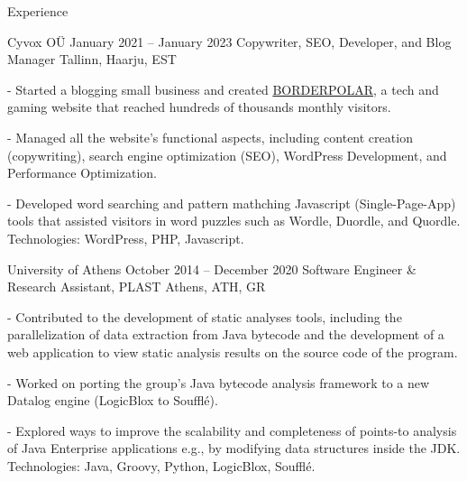 \documentclass{resume}
\begin{document}
\newcommand{\mytilde}{\raise.17ex\hbox{$\scriptstyle\mathtt{\sim}$}}
\newcommand{\indentitem}{\setlength\itemindent{25pt}}

\begin{rSection}{Experience}
  \begin{rSubsection}
    {Cyvox OÜ}
    {January 2021 -- January 2023}
    {Copywriter, SEO, Developer, and Blog Manager}
    {Tallinn, Haarju, EST}
    \item[-] Started a blogging small business and created \href{http://borderpolar.com}{BORDERPOLAR}, a tech and gaming website that reached hundreds of thousands monthly visitors.
    \item[-] Managed all the website's functional aspects, including content creation (copywriting), search engine optimization (SEO), WordPress Development, and Performance Optimization.
    \item[-] Developed word searching and pattern mathching Javascript (Single-Page-App) tools that assisted visitors in word puzzles such as Wordle, Duordle, and Quordle.
    \\
  \footnotesize\textcolor{TechsColor}{Technologies: WordPress, PHP, Javascript.}\\
  \end{rSubsection}

\begin{rSubsection}
  {University of Athens}
  {October 2014 -- December 2020}
  {Software Engineer \& Research Assistant, PLAST}
  {Athens, ATH, GR}
    \item[-] Contributed to the development of static analyses tools, including the parallelization of data extraction from Java bytecode and the development of a web application to view static analysis results on the source code of the program.
    \item[-] Worked on porting the group's Java bytecode analysis framework to a new Datalog engine (LogicBlox to Soufflé).
    \item[-] Explored ways to improve the scalability and completeness of points-to analysis of Java Enterprise applications e.g., by modifying data structures inside the JDK.
    \\
\footnotesize\textcolor{TechsColor}{Technologies: Java, Groovy, Python, LogicBlox, Soufflé.}\\
\end{rSubsection}


\end{rSection}
\end{document}
